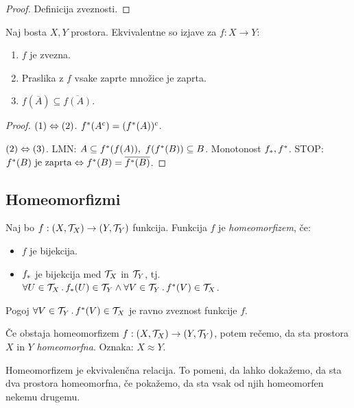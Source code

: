 \begin{proof}
    Definicija zveznosti.
\end{proof}

\begin{trditev}
    Naj bosta $X, Y$ prostora. Ekvivalentne so izjave za $f: X \to Y$:
    \begin{enumerate}
        \item $f$ je zvezna.
        \item Praslika z $f$ vsake zaprte množice je zaprta.
        \item $f(\overline{A}) \subseteq \overline{f(A)}$.
    \end{enumerate}
\end{trditev}

\begin{proof}
    $(1) \Leftrightarrow (2)$. $f^{*}(A^c) = (f^{*}(A))^c$.

    $(2) \Leftrightarrow (3)$. LMN: $A \subseteq f^{*}(f(A)), \ f(f^{*}(B)) \subseteq B$. Monotonost $f_{*}, f^{*}$. STOP:
    $f^{*}(B) \text{ je zaprta} \Leftrightarrow f^{*}(B) = \overline{f^{*}(B)}$.
\end{proof}

\subsection{Homeomorfizmi}
\begin{definicija}
    Naj bo $f: (X, \mathcal{T}_X) \to (Y, \mathcal{T}_Y)$ funkcija. Funkcija $f$ je \emph{homeomorfizem}, če:
    \begin{itemize}
        \item $f$ je bijekcija.
        \item $f_{*}$ je bijekcija med $\mathcal{T}_X$ in $\mathcal{T}_Y$, tj. $\forall U \in \mathcal{T}_X \,.\, f_{*}(U) \in \mathcal{T}_Y \land \forall V \in \mathcal{T}_Y \,.\, f^{*}(V) \in \mathcal{T}_X$.
    \end{itemize}
\end{definicija}

\begin{opomba}
    Pogoj $\forall V \in \mathcal{T}_Y \,.\, f^{*}(V) \in \mathcal{T}_X$ je ravno zveznost funkcije $f$.
\end{opomba}

\begin{definicija}
    Če obstaja homeomorfizem $f: (X, \mathcal{T}_X) \to (Y, \mathcal{T}_Y)$, potem rečemo, da sta prostora $X$ in $Y$ \emph{homeomorfna}. Oznaka: $X \approx  Y$.
\end{definicija}

\begin{opomba}
    Homeomorfizem je ekvivalenčna relacija. To pomeni, da lahko dokažemo, da sta dva prostora homeomorfna, če pokažemo, da sta vsak od njih homeomorfen nekemu drugemu.
\end{opomba}

